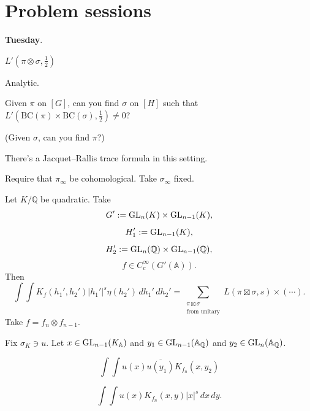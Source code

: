 \documentclass[reqno]{amsart} 
\begin{document}
\section{Problem sessions}\label{sec:cnfhlpu0ac}
\textbf{Tuesday}.

$L'(\pi \otimes \sigma, \tfrac{1}{2} )$

Analytic.

Given $\pi$ on $[G]$, can you find $\sigma$ on $[H]$ such that $L '(\mathrm{BC}(\pi)\times \mathrm{BC}(\sigma), \tfrac{1}{2} ) \neq 0$?

(Given $\sigma$, can you find $\pi$?)

There's a Jacquet--Rallis trace formula in this setting.

Require that $\pi _\infty$ be cohomological.  Take $\sigma _\infty$ fixed.

Let $K/\mathbb{Q}$ be quadratic.  Take
\begin{equation*}
G' := \operatorname{GL}_n(K) \times \operatorname{GL}_{n - 1}(K),
\end{equation*}
\begin{equation*}
H_1 ' := \operatorname{GL}_{n - 1}(K),
\end{equation*}
\begin{equation*}
H_2 ' := \operatorname{GL}_n(\mathbb{Q}) \times \operatorname{GL}_{n - 1}(\mathbb{Q}),
\end{equation*}
\begin{equation*}
f \in C_c^\infty(G'(\mathbb{A})).
\end{equation*}
Then
\begin{equation*}
  \int \int K_f(h_1', h_2')
  \lvert h_1' \rvert^s
  \eta(h_2')
  \, d h_1' \, d h_2'
  =
  \sum_{
    \substack{
      \pi \boxtimes \sigma  \\
       \text{from unitary}
    }
  }
  L(\pi \boxtimes \sigma, s)
  \times (\dotsb).
\end{equation*}
Take $f = f_n \otimes f_{n - 1}$.

Fix $\sigma_K \ni u$.  Let $x \in \operatorname{GL}_{n - 1}(K_{\mathbb{A}})$ and $y_1 \in \operatorname{GL}_{n - 1}(\mathbb{A}_{\mathbb{Q}})$ and $y_2 \in \operatorname{GL}_n(\mathbb{A}_{\mathbb{Q}})$.

\begin{equation*}
  \int
  \int u(x) \overline{u(y_1)}
  K_{f_n}(x, y_2)
\end{equation*}


\begin{equation*}
\int \int u(x) K_{f_n}(x, y) \lvert x \rvert^s \, d x \, d y.
\end{equation*}
\end{document}
